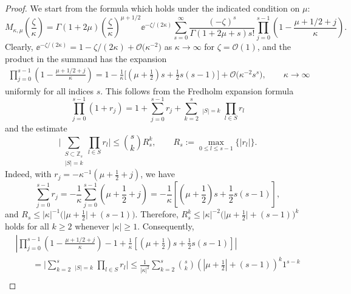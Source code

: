 \begin{proof}
We start from the formula \cite[equation~(13.14.6)]{DLMF} which holds under the indicated condition on $\mu$:
\begin{equation*}
 M_{\kappa,\mu}\left(\frac{\zeta}{\kappa}\right)=
 \Gamma(1+2\mu)\left(\frac{\zeta}{\kappa}\right)^{\mu+1/2}\ee^{-\zeta/(2\kappa)}\sum_{s=0}^\infty\frac{(-\zeta)^s}{\Gamma(1+2\mu+s)s!}\prod_{j=0}^{s-1}\left(1-\frac{\mu+1/2+j}{\kappa}\right).
\end{equation*}
Clearly, $\ee^{-\zeta/(2\kappa)}=1-\zeta/(2\kappa)+\mathcal{O}\big(\kappa^{-2}\big)$ as $\kappa\to\infty$ for $\zeta=\mathcal{O}(1)$, and the product in the summand has the expansion
\begin{gather}
 \prod_{j=0}^{s-1}\left(1-\frac{\mu+1/2+j}{\kappa}\right) = 1 -\frac{1}{\kappa}\bigg[\left(\mu+\frac{1}{2}\right)s +\frac{1}{2}s(s-1)\bigg] + \mathcal{O}\big(\kappa^{-2}s^s\big),\qquad\kappa\to\infty\!\!\!
\label{eq:uniform-estimate}
\end{gather}
uniformly for all indices $s$.
This follows from the Fredholm expansion formula
\begin{equation*}
 \prod_{j=0}^{s-1}(1+r_j) = 1+\sum_{j=0}^{s-1}r_j + \sum_{k=2}^{s}
 \mathop{\sum_{S\subset \mathbb{Z}_s}}_{|S|=k}\prod_{l\in S}r_l
\end{equation*}
and the estimate
\begin{equation*}
 \Biggl| \sum_{\substack{S\subset \mathbb{Z}_s \\ |S|=k}}\prod_{l\in S}r_l\Biggr|\le \binom{s}{k}R_s^k,\qquad R_s:=\max_{0\le l\le s-1}\{|r_l|\}.
\end{equation*}
Indeed, with $r_j=-\kappa^{-1}(\mu+\frac{1}{2}+j)$, we have
\begin{equation*}
 \sum_{j=0}^{s-1}r_j=-\frac{1}{\kappa}\sum_{j=0}^{s-1}\left(\mu+\frac{1}{2}+j\right) = -\frac{1}{\kappa}\left[\left(\mu+\frac{1}{2}\right)s + \frac{1}{2}s(s-1)\right],
\end{equation*}
and $R_s\le |\kappa|^{-1}\big(\big|\mu+\frac{1}{2}\big| + (s-1)\big)$. Therefore, $R_s^k\le |\kappa|^{-2}\big(\big|\mu+\frac{1}{2}\big|+(s-1)\big)^k$ holds for all $k\ge 2$ whenever $|\kappa|\ge 1$. Consequently,
\begin{gather*}
 \left|\prod_{j=0}^{s-1}\left(1-\frac{\mu+1/2+j}{\kappa}\right)-1+\right. \left.\frac{1}{\kappa}\left[\left(\mu+\frac{1}{2}\right)s+ \frac{1}{2}s(s-1)\right]\right|\\
 \qquad=\Biggl|\sum_{k=2}^s\mathop{\sum_{S\subset\mathbb{Z}_s}}_{|S|=k}\prod_{l\in S}r_l\Biggr|\le \frac{1}{|\kappa|^2}\sum_{k=2}^s\binom{s}{k}\left(\left|\mu+\frac{1}{2}\right|+(s-1)\right)^k1^{s-k}\\

\end{gather*}
\end{proof}

